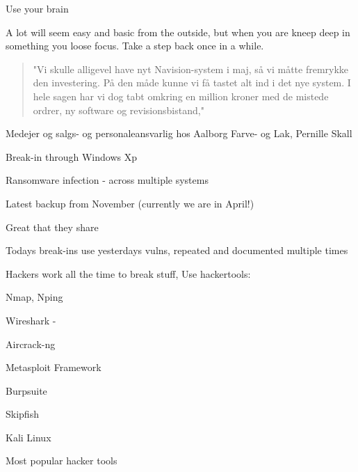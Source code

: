 \documentclass[20pt,landscape,a4paper,footrule]{foils}
\begin{document}
\centerline{Use your brain}

A lot will seem easy and basic from the outside, but when you are kneep deep in something you loose focus. Take a step back once in a while.


\begin{quote}
"Vi skulle alligevel have nyt Navision-system i maj, så vi måtte fremrykke den investering. På den måde kunne vi få tastet alt ind i det nye system. I hele sagen har vi dog tabt omkring en million kroner med de mistede ordrer, ny software og revisionsbistand,"
\end{quote}
Medejer og salgs- og personaleansvarlig hos Aalborg Farve- og Lak, Pernille Skall

\begin{list1}
\item Break-in through Windows Xp
\item Ransomware infection - across multiple systems
\item Latest backup from November (currently we are in April!)
\item Great that they share
\item Todays break-ins use yesterdays vulns, repeated and documented multiple times
\end{list1}





\begin{list2}
\item Hackers work all the time to break stuff, Use hackertools:
\item Nmap, Nping 
\item Wireshark - 
\item Aircrack-ng 
\item Metasploit Framework 
\item Burpsuite 
\item Skipfish 
\item Kali Linux 
\end{list2}

\vskip 5mm
\centerline{Most popular hacker tools }
\end{document}
